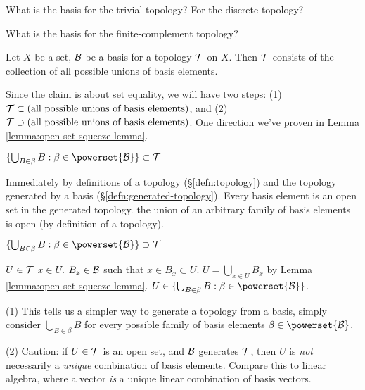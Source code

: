  What is the basis for the trivial topology? For the discrete
topology?

 What is the basis for the finite-complement topology?

\begin{lemma}\label{lemma:basis-generates-topology}
  Let $X$ be a set, $\mathcal{B}$ be a basis for a topology
  $\mathcal{T}$ on $X$. Then $\mathcal{T}$ consists of the collection
  of all possible unions of basis elements.
\end{lemma}

\begin{pfSketch}
  Since the claim is about set equality, we will have two steps: (1)
  $\mathcal{T}\subset\mbox{(all possible unions of basis elements)}$,
  and (2)
  $\mathcal{T}\supset\mbox{(all possible unions of basis elements)}$.
  One direction we've proven in Lemma \ref{lemma:open-set-squeeze-lemma}.
\end{pfSketch}

\begin{spf}
  \step $\{\bigcup_{B\in\beta} B : \beta\in\powerset{\topology{B}}\}\subset\topology{T}$
  \begin{spf}
    Immediately by definitions of a topology (\S\ref{defn:topology}) and
    the topology generated by a basis (\S\ref{defn:generated-topology}).
    \step Every basis element is an open set in the generated topology.
    \Hence the union of an arbitrary family of basis elements is open
    (by definition of a topology).
  \end{spf}
  \step $\{\bigcup_{B\in\beta} B : \beta\in\powerset{\topology{B}}\}\supset\topology{T}$
  \begin{spf}
    \Let $U\in\mathcal{T}$
    \Let $x\in U$.
    \Consider $B_{x}\in\mathcal{B}$ such that $x\in B_{x}\subset U$.
    \Hence $U=\bigcup_{x\in U}B_{x}$ by Lemma \ref{lemma:open-set-squeeze-lemma}.
    \Thus $U\in\{\bigcup_{B\in\beta} B : \beta\in\powerset{\topology{B}}\}$.\placeQED{}
  \end{spf}
\end{spf}

 (1) This tells us a simpler way to generate a topology from
a basis, simply consider $\bigcup_{B\in\beta}B$ for every possible
family of basis elements $\beta\in\powerset{\topology{B}}$.

(2) Caution: if $U\in\mathcal{T}$ is an open set, and $\mathcal{B}$
generates $\mathcal{T}$, then $U$ is \emph{not} necessarily a
\emph{unique} combination of basis elements. Compare this to linear
algebra, where a vector \emph{is} a unique linear combination of basis
vectors. 

